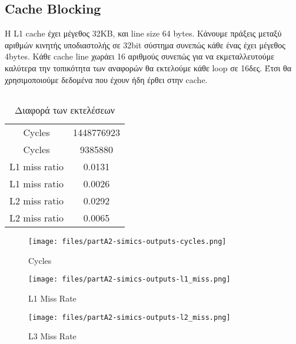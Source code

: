 \documentclass[a4paper,12pt]{article}
\begin{document}


\pagebreak

\subsection{Cache Blocking}

Η L1 cache έχει μέγεθος 32KB, και line size 64 bytes. Κάνουμε πράξεις μεταξύ
αριθμών κινητής υποδιαστολής σε 32bit σύστημα συνεπώς κάθε ένας έχει μέγεθος
4bytes. Κάθε cache line χωράει 16 αριθμούς συνεπώς για να εκμεταλλευτούμε
καλύτερα την τοπικότητα των αναφορών θα εκτελούμε κάθε loop σε 16δες. Έτσι θα
χρησιμοποιούμε δεδομένα που έχουν ήδη έρθει στην cache.

\inputminted[linenos,fontsize=\scriptsize,frame=leftline]{c}{files/partA2-v3_patched-partA.c}


\begin{table}[H]
    \centering
    \begin{tabular}{| c | c |}
        \hline
        Cycles & 1448776923 \\
        Cycles & 9385880    \\
        \hline
        L1 miss ratio & 0.0131 \\
        L1 miss ratio & 0.0026 \\
        \hline
        L2 miss ratio & 0.0292 \\
        L2 miss ratio & 0.0065 \\
        \hline
    \end{tabular}
    \caption{Διαφορά των εκτελέσεων}
    \label{fig:T4}
\end{table}

\begin{figure}[H]
	\centering
    \texttt{[image: files/partA2-simics-outputs-cycles.png]}
	\caption{Cycles}
	\label{fig:B1}
\end{figure}

\begin{figure}[H]
	\centering
    \texttt{[image: files/partA2-simics-outputs-l1\_miss.png]}
    \caption{L1 Miss Rate}
	\label{fig:B2}
\end{figure}

\begin{figure}[H]
	\centering
    \texttt{[image: files/partA2-simics-outputs-l2\_miss.png]}
    \caption{L3 Miss Rate}
	\label{fig:B3}
\end{figure}



\end{document}
